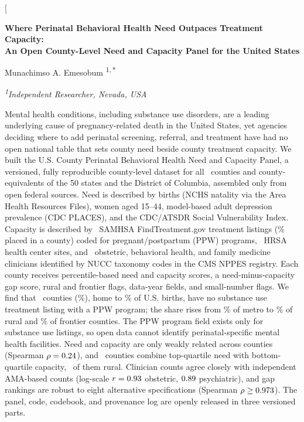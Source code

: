 \documentclass[10pt,twocolumn,letterpaper]{article}
\begin{document}
\twocolumn[
\begin{@twocolumnfalse}
\begin{center}
{\large\bfseries Where Perinatal Behavioral Health Need Outpaces Treatment Capacity:\\[2pt]
An Open County-Level Need and Capacity Panel for the United States\par}
\vspace{8pt}
{\normalsize Munachimso A. Emesobum\,\,\textsuperscript{1,\,$*$}\par}
\vspace{3pt}
{\small\itshape \textsuperscript{1}Independent Researcher, Nevada, USA\par}
\vspace{10pt}
\begin{minipage}{0.80\textwidth}
\small
Mental health conditions, including substance use disorders, are a leading underlying cause of pregnancy-related death in the United States, yet agencies deciding where to add perinatal screening, referral, and treatment have had no open national table that sets county need beside county treatment capacity. We built the U.S. County Perinatal Behavioral Health Need and Capacity Panel, a versioned, fully reproducible county-level dataset for all \NCounties\ counties and county-equivalents of the 50 states and the District of Columbia, assembled only from open federal sources. Need is described by births (NCHS natality via the Area Health Resources Files), women aged 15--44, model-based adult depression prevalence (CDC PLACES), and the CDC/ATSDR Social Vulnerability Index. Capacity is described by \FTUnique\ SAMHSA FindTreatment.gov treatment listings (\FTAssignedPct\% placed in a county) coded for pregnant/postpartum (PPW) programs, \HCSites\ HRSA health center sites, and \Clinicians\ obstetric, behavioral health, and family medicine clinicians identified by NUCC taxonomy codes in the CMS NPPES registry. Each county receives percentile-based need and capacity scores, a need-minus-capacity gap score, rural and frontier flags, data-year fields, and small-number flags. We find that \NNoPPW\ counties (\PctNoPPW\%), home to \PctBirthsNoPPW\% of U.S. births, have no substance use treatment listing with a PPW program; the share rises from \NoPPWMetro\% of metro to \NoPPWRural\% of rural and \NoPPWFrontier\% of frontier counties. The PPW program field exists only for substance use listings, so open data cannot identify perinatal-specific mental health facilities. Need and capacity are only weakly related across counties (Spearman $\rho=0.24$), and \NHNLC\ counties combine top-quartile need with bottom-quartile capacity, \HNLCRural\ of them rural. Clinician counts agree closely with independent AMA-based counts (log-scale $r=0.93$ obstetric, $0.89$ psychiatric), and gap rankings are robust to eight alternative specifications (Spearman $\rho\geq0.973$). The panel, code, codebook, and provenance log are openly released in three versioned parts.\par

\end{minipage}
\end{center}
\end{@twocolumnfalse}
\end{document}
